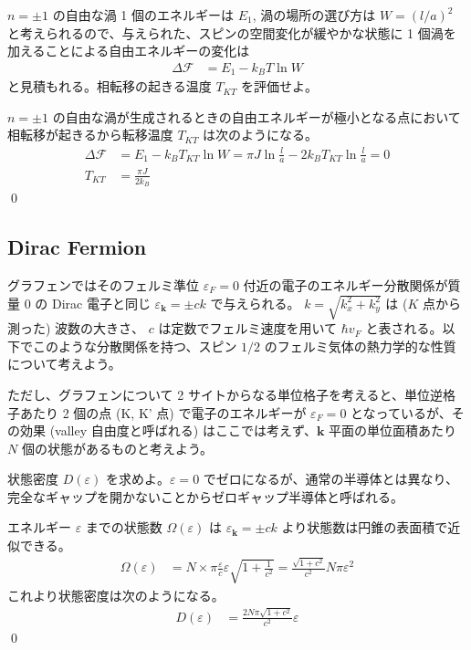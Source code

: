 \documentclass[uplatex,dvipdfmx,a4paper,11pt]{jlreq}
\makeatletter
\newcommand{\kk}{\bm{k}}
\numberwithin{equation}{section}
\theoremstyle{definition}
\renewenvironment{proof}[1][\proofname]{\par
  \normalfont
  \topsep6\p@\@plus6\p@ \trivlist
  \item[\hskip\labelsep{\bfseries #1}\@addpunct{\bfseries}]\ignorespaces\quad\par
}{%
  \qed\endtrivlist\@endpefalse
}
\renewcommand\proofname{証明}
\makeatother
\begin{document}
\begin{problem}
$n = \pm1$ の自由な渦 1 個のエネルギーは $E_1$, 渦の場所の選び方は $W = (l/a)^2$ と考えられるので、与えられた、スピンの空間変化が緩やかな状態に 1 個渦を加えることによる自由エネルギーの変化は
\begin{align}
  \Delta\mathcal{F} & = E_1 - k_BT\ln W
\end{align}
と見積もれる。相転移の起きる温度 $T_{KT}$ を評価せよ。
\end{problem}
\begin{proof}
  $n = \pm 1$ の自由な渦が生成されるときの自由エネルギーが極小となる点において相転移が起きるから転移温度 $T_{KT}$ は次のようになる。
  \begin{align}
    \Delta\mathcal{F} & = E_1 - k_BT_{KT}\ln W = \pi J\ln\frac{l}{a} - 2k_BT_{KT}\ln\frac{l}{a} = 0 \\
    T_{KT}            & = \frac{\pi J}{2k_B}
  \end{align}
\end{proof}

\clearpage

\subsection{Dirac Fermion}
\begin{problem}
グラフェンではそのフェルミ準位 $\varepsilon_F = 0$ 付近の電子のエネルギー分散関係が質量 0 の Dirac 電子と同じ $\varepsilon_{\kk} = \pm ck$ で与えられる。
$k = \sqrt{k_x^2 + k_y^2}$ は ($K$ 点から測った) 波数の大きさ、 $c$ は定数でフェルミ速度を用いて $\hbar v_F$ と表される。以下でこのような分散関係を持つ、スピン $1/2$ のフェルミ気体の熱力学的な性質について考えよう。

ただし、グラフェンについて 2 サイトからなる単位格子を考えると、単位逆格子あたり 2 個の点 (K, K' 点) で電子のエネルギーが $\varepsilon_F = 0$ となっているが、その効果 (valley 自由度と呼ばれる) はここでは考えず、$\kk$ 平面の単位面積あたり $N$ 個の状態があるものと考えよう。

状態密度 $D(\varepsilon)$ を求めよ。$\varepsilon = 0$ でゼロになるが、通常の半導体とは異なり、完全なギャップを開かないことからゼロギャップ半導体と呼ばれる。
\end{problem}
\begin{proof}
  エネルギー $\varepsilon$ までの状態数 $\Omega(\varepsilon)$ は $\varepsilon_{\kk} = \pm ck$ より状態数は円錐の表面積で近似できる。
  \begin{align}
    \Omega(\varepsilon) & = N\times \pi\frac{\varepsilon}{c}\varepsilon\sqrt{1 + \frac{1}{c^2}} = \frac{\sqrt{1 + c^2}}{c^2}N\pi\varepsilon^2
  \end{align}
  これより状態密度は次のようになる。
  \begin{align}
    D(\varepsilon) & = \frac{2N\pi\sqrt{1 + c^2}}{c^2}\varepsilon
  \end{align}
\end{proof}
\end{document}
